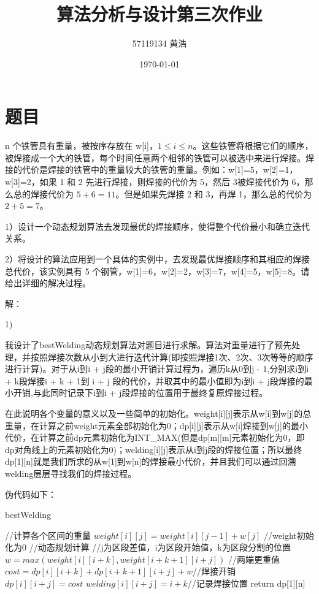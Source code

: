 \documentclass[UTF8]{ctexart}
\title{算法分析与设计第三次作业}
\author{57119134 黄浩}
\date{\today}
\begin{document}
\maketitle

\section{题目}

n 个铁管具有重量，被按序存放在 w[i]，$1 \le i \le n$。这些铁管将根据它们的顺序，被焊接成一个大的铁管，每个时间任意两个相邻的铁管可以被选中来进行焊接。焊接的代价是焊接的铁管中的重量较大的铁管的重量。例如：w[1]=5，w[2]=1，w[3]=2，如果 1 和 2 先进行焊接，则焊接的代价为 5，然后 3被焊接代价为 6，那么总的焊接代价为 $5+6=11$。但是如果先焊接 2 和 3，再焊 1，那么总的代价为$2+5=7$。
 
1）设计一个动态规划算法去发现最优的焊接顺序，使得整个代价最小和确立迭代关系。

2）将设计的算法应用到一个具体的实例中，去发现最优焊接顺序和其相应的焊接总代价，该实例具有 5 个钢管，w[1]=6，w[2]=2，w[3]=7，w[4]=5，w[5]=8。请给出详细的解决过程。

\noindent 解：

1)

我设计了bestWelding动态规划算法对题目进行求解。算法对重量进行了预先处理，并按照焊接次数从小到大进行迭代计算(即按照焊接1次、2次、3次等等的顺序进行计算)。对于从i到i + j段的最小开销计算过程为，遍历k从0到j - 1,分别求i到i + k段焊接i + k + 1到 i + j 段的代价，并取其中的最小值即为i到i + j段焊接的最小开销,与此同时记录下i到i + j段焊接的位置用于最终复原焊接过程。

在此说明各个变量的意义以及一些简单的初始化。weight[i][j]表示从w[i]到w[j]的总重量，在计算之前weight元素全部初始化为0；dp[i][j]表示从w[i]焊接到w[j]的最小代价，在计算之前dp元素初始化为INT\_MAX(但是dp[m][m]元素初始化为0，即dp对角线上的元素初始化为0)；welding[i][j]表示从i到j段的焊接位置；所以最终dp[1][n]就是我们所求的从w[1]到w[n]的焊接最小代价，并且我们可以通过回溯welding层层寻找我们的焊接过程。

伪代码如下：

\begin{algorithm}[h]
	\caption{bestWelding}
	\begin{algorithmic}[1]
	\STATE //计算各个区间的重量
			\STATE $weight[i][j] = weight[i][j - 1] + w[j]$ //weight初始化为0
		\ENDFOR
	\ENDFOR
	\STATE //动态规划计算
	\STATE //j为区段差值，i为区段开始值，k为区段分割的位置
				\STATE $w = max(weight[i][i + k], weight[i + k + 1][i + j])$ //两端更重值
				\STATE $cost = dp[i][i + k] + dp[i + k + 1][i + j] + w$//焊接开销
					\STATE $dp[i][i + j] = cost$
					\STATE $welding[i][i + j] = i + k$//记录焊接位置
				\ENDIF
			\ENDFOR
		\ENDFOR
	\ENDFOR
	\STATE return dp[1][n]
	\end{algorithmic}
\end{algorithm}
\end{document}
